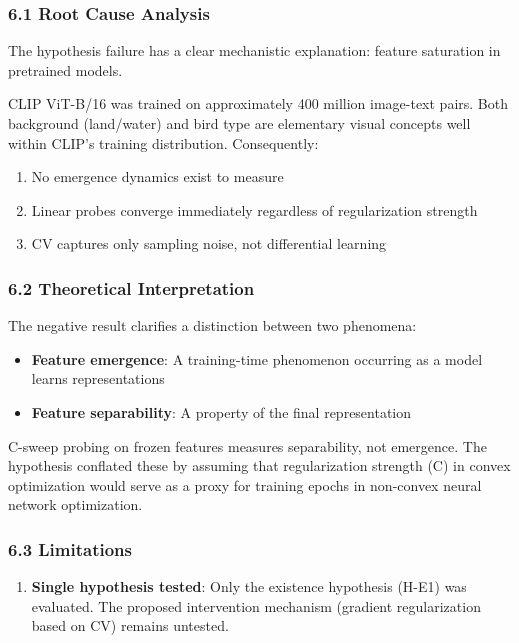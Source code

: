 
\subsubsection{6.1 Root Cause Analysis}

The hypothesis failure has a clear mechanistic explanation: feature saturation in pretrained models.

CLIP ViT-B/16 was trained on approximately 400 million image-text pairs. Both background (land/water) and bird type are elementary visual concepts well within CLIP's training distribution. Consequently:

\begin{enumerate}
\item No emergence dynamics exist to measure
\item Linear probes converge immediately regardless of regularization strength
\item CV captures only sampling noise, not differential learning
\end{enumerate}

\subsubsection{6.2 Theoretical Interpretation}

The negative result clarifies a distinction between two phenomena:

\begin{itemize}
\item \textbf{Feature emergence}: A training-time phenomenon occurring as a model learns representations
\item \textbf{Feature separability}: A property of the final representation
\end{itemize}

C-sweep probing on frozen features measures separability, not emergence. The hypothesis conflated these by assuming that regularization strength (C) in convex optimization would serve as a proxy for training epochs in non-convex neural network optimization.

\subsubsection{6.3 Limitations}

\begin{enumerate}
\item \textbf{Single hypothesis tested}: Only the existence hypothesis (H-E1) was evaluated. The proposed intervention mechanism (gradient regularization based on CV) remains untested.
\end{enumerate}

